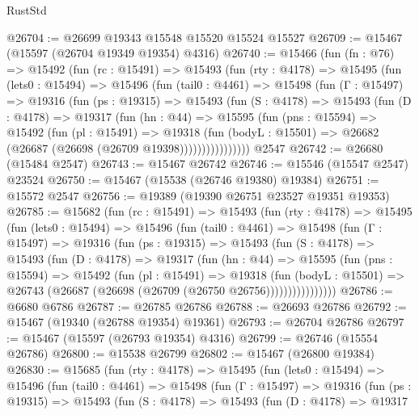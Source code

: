 \begin{lexlean}{RustStd}
\begin{coremodule}
@26704 := @26699 @19343 @15548 @15520 @15524 @15527
@26709 := @15467 (@15597 (@26704 @19349 @19354) @4316)
@26740 := @15466
    (fun (fn : @76) =>
    @15492
      (fun (rc : @15491) =>
      @15493
        (fun (rty : @4178) =>
        @15495
          (fun (lets0 : @15494) =>
          @15496
            (fun (tail0 : @4461) =>
            @15498
              (fun (Γ : @15497) =>
              @19316
                (fun (ps : @19315) =>
                @15493
                  (fun (S : @4178) =>
                  @15493
                    (fun (D : @4178) =>
                    @19317
                      (fun (hn : @44) =>
                      @15595
                        (fun (pns : @15594) =>
                        @15492
                          (fun (pl : @15491) =>
                          @19318
                            (fun (bodyL : @15501) =>
                            @26682 (@26687 (@26698 (@26709 @19398))))))))))))))))
    @2547
@26742 := @26680 (@15484 @2547)
@26743 := @15467 @26742
@26746 := @15546 (@15547 @2547) @23524
@26750 := @15467 (@15538 (@26746 @19380) @19384)
@26751 := @15572 @2547
@26756 := @19389 (@19390 @26751 @23527 @19351 @19353)
@26785 := @15682
    (fun (rc : @15491) =>
    @15493
      (fun (rty : @4178) =>
      @15495
        (fun (lets0 : @15494) =>
        @15496
          (fun (tail0 : @4461) =>
          @15498
            (fun (Γ : @15497) =>
            @19316
              (fun (ps : @19315) =>
              @15493
                (fun (S : @4178) =>
                @15493
                  (fun (D : @4178) =>
                  @19317
                    (fun (hn : @44) =>
                    @15595
                      (fun (pns : @15594) =>
                      @15492
                        (fun (pl : @15491) =>
                        @19318
                          (fun (bodyL : @15501) =>
                          @26743 (@26687 (@26698 (@26709 (@26750 @26756))))))))))))))))
@26786 := @6680 @6786
@26787 := @26785 @26786
@26788 := @26693 @26786
@26792 := @15467 (@19340 (@26788 @19354) @19361)
@26793 := @26704 @26786
@26797 := @15467 (@15597 (@26793 @19354) @4316)
@26799 := @26746 (@15554 @26786)
@26800 := @15538 @26799
@26802 := @15467 (@26800 @19384)
@26830 := @15685
    (fun (rty : @4178) =>
    @15495
      (fun (lets0 : @15494) =>
      @15496
        (fun (tail0 : @4461) =>
        @15498
          (fun (Γ : @15497) =>
          @19316
            (fun (ps : @19315) =>
            @15493
              (fun (S : @4178) =>
              @15493
                (fun (D : @4178) =>
                @19317

\end{coremodule}
\end{lexlean}
